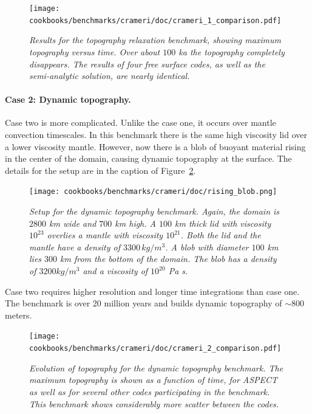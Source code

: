 \documentclass{article}
\newcommand{\aspect}{\textsc{ASPECT}}
\begin{document}
\begin{figure}
  \begin{center}
    \texttt{[image: cookbooks/benchmarks/crameri/doc/crameri\_1\_comparison.pdf]}
  \end{center}
  \caption{\it Results for the topography relaxation benchmark, showing maximum topography
   versus time. Over about $100$ ka the topography completely disappears. The results of four
   free surface codes, as well as the semi-analytic solution, are nearly identical.}
  \label{fig:crameri-benchmark-relaxation-topography}
\end{figure}

\paragraph{Case 2: Dynamic topography.}
\label{sec:benchmark-crameri-case-2}

Case two is more complicated. Unlike the case one, it occurs over mantle convection
timescales.  In this benchmark there is the same high viscosity lid over a lower
viscosity mantle. However, now there is a blob of buoyant material rising in the
center of the domain, causing dynamic topography at the surface. The details for the setup
are in the caption of Figure~\ref{fig:crameri-benchmark-rising-blob}.

\begin{figure}
  \begin{center}
    \texttt{[image: cookbooks/benchmarks/crameri/doc/rising\_blob.png]}
  \end{center}
  \caption{\it Setup for the dynamic topography benchmark. Again, the domain is $2800$ km
  wide and $700$ km high.  A $100$ km thick lid with viscosity $10^{23}$ overlies a mantle
  with viscosity $10^{21}$.  Both the lid and the mantle have a density of $3300\,kg/m^3$.
  A blob with diameter $100$ km lies $300$ km from the bottom of the domain.  The blob has
  a density of $3200 kg/m^3$ and a viscosity of $10^{20}$ Pa s.}
  \label{fig:crameri-benchmark-rising-blob}
\end{figure}

Case two requires higher resolution and longer time integrations than case one. The benchmark
is over 20 million years and builds dynamic topography of $\sim 800$ meters.

\begin{figure}
  \begin{center}
    \texttt{[image: cookbooks/benchmarks/crameri/doc/crameri\_2\_comparison.pdf]}
  \end{center}
  \caption{\it Evolution of topography for the dynamic topography benchmark. The maximum topography
   is shown as a function of time, for \aspect{} as well as for several other codes participating in
   the benchmark. This benchmark shows considerably more scatter between the codes.}
  \label{fig:crameri-2-comparison}
\end{figure}
\end{document}
